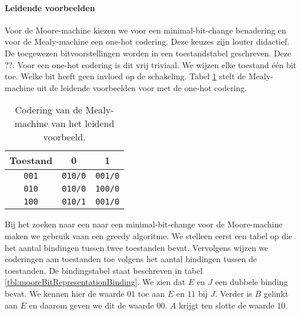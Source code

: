 \paragraph{Leidende voorbeelden}Voor de Moore-machine kiezen we voor een minimal-bit-change benadering en voor de Mealy-machine een one-hot codering. Deze keuzes zijn louter didactief. De toegewezen bitvoorstellingen worden in een toestandstabel geschreven. Deze ??. Voor een one-hot codering is dit vrij triviaal. We wijzen elke toestand \'e\'en bit toe. Welke bit heeft geen invloed op de schakeling. Tabel \ref{tbl:mealyBitRepresentation} stelt de Mealy-machine uit de leidende voorbeelden voor met de one-hot codering.
\begin{table}[hbt]
\centering
\begin{tabular}{c|cc}
Toestand&0&1\\\hline
\texttt{001}&\texttt{010/0}&\texttt{001/0}\\
\texttt{010}&\texttt{010/0}&\texttt{100/0}\\
\texttt{100}&\texttt{010/1}&\texttt{001/0}\\
\end{tabular}
\caption{Codering van de Mealy-machine van het leidend voorbeeld.}
\label{tbl:mealyBitRepresentation}
\end{table}
Bij het zoeken naar een naar een minimal-bit-change voor de Moore-machine maken we gebruik vaan een greedy algoritme. We stelleen eerst een tabel op die het aantal bindingen tussen twee toestanden bevat. Vervolgens wijzen we coderingen aan toestanden toe volgens het aantal bindingen tussen de toestanden. De bindingstabel staat beschreven in tabel \ref{tbl:mooreBitRepresentationBinding}. We zien dat $E$ en $J$ een dubbele binding bevat. We kennen hier de waarde $01$ toe aan $E$ en $11$ bij $J$. Verder is $B$ gelinkt aan $E$ en daarom geven we dit de waarde $00$. $A$ krijgt ten slotte de waarde $10$.
\begin{table}[hbt]
\centering
{}
\caption{Codering van de Moore-machine van het leidend voorbeeld.}
\label{tbl:mooreBitRepresentation}
\end{table}
